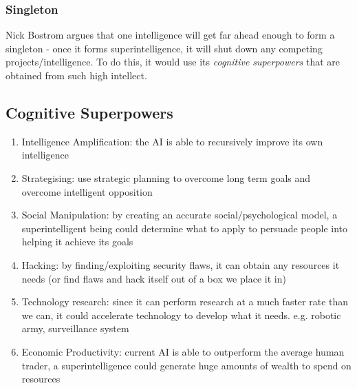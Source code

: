 \subsubsection{Singleton}
Nick Bostrom argues that one intelligence will get far ahead enough to form a singleton - once it forms superintelligence, it will shut down any competing projects/intelligence. To do this, it would use its \emph{cognitive superpowers} that are obtained from such high intellect.

\subsection{Cognitive Superpowers}
\begin{enumerate}
    \item Intelligence Amplification: the AI is able to recursively improve its own intelligence
    \item Strategising: use strategic planning to overcome long term goals and overcome intelligent opposition
    \item Social Manipulation: by creating an accurate social/psychological model, a superintelligent being could determine what to apply to persuade people into helping it achieve its goals
    \item Hacking: by finding/exploiting security flaws, it can obtain any resources it needs (or find flaws and hack itself out of a box we place it in)
    \item Technology research: since it can perform research at a much faster rate than we can, it could accelerate technology to develop what it needs. e.g. robotic army, surveillance system
    \item Economic Productivity: current AI is able to outperform the average human trader, a superintelligence could generate huge amounts of wealth to spend on resources
\end{enumerate}

